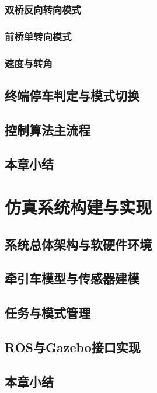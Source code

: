 \documentclass{article}
\begin{document}
\subsubsection{双桥反向转向模式}
\subsubsection{前桥单转向模式}
\subsubsection{速度与转角}
\subsection{终端停车判定与模式切换}
\subsection{控制算法主流程}
\subsection{本章小结}

\section{仿真系统构建与实现}
\subsection{系统总体架构与软硬件环境}
\subsection{牵引车模型与传感器建模}
\subsection{任务与模式管理}
\subsection{ROS与Gazebo接口实现}
\subsection{本章小结}
\end{document}
